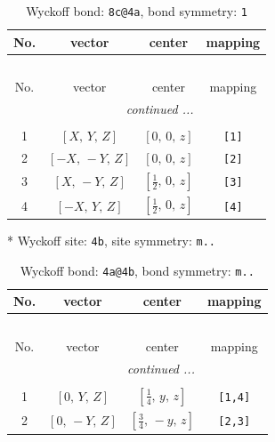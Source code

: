 \documentclass[fleqn,8pt]{jsarticle}
\begin{document}
\renewcommand{\arraystretch}{1.2}
\begin{longtable}{cccc}
\caption{Wyckoff bond: {\tt 8c@4a}, bond symmetry: {\tt 1}}
 \\
 \hline \hline
No. & vector & center & mapping \\ \hline \endfirsthead

\multicolumn{3}{l}{\tablename\ \thetable{}} \\
 \hline \hline
No. & vector & center & mapping \\ \hline \endhead

 \hline \hline
\multicolumn{3}{r}{\footnotesize\it continued ...} \\ \endfoot

 \hline \hline
\multicolumn{3}{r}{} \\ \endlastfoot

1 & $\left[ X,\, Y,\, Z \right]$ & $\left[ 0,\, 0,\, z \right]$ & {\tt [1]} \\ \hline
2 & $\left[ - X,\, - Y,\, Z \right]$ & $\left[ 0,\, 0,\, z \right]$ & {\tt [2]} \\ \hline
3 & $\left[ X,\, - Y,\, Z \right]$ & $\left[ \frac{1}{2},\, 0,\, z \right]$ & {\tt [3]} \\ \hline
4 & $\left[ - X,\, Y,\, Z \right]$ & $\left[ \frac{1}{2},\, 0,\, z \right]$ & {\tt [4]} \\
\end{longtable}
* Wyckoff site: {\tt 4b}, site symmetry: {\tt m..}
\renewcommand{\arraystretch}{1.2}
\begin{longtable}{cccc}
\caption{Wyckoff bond: {\tt 4a@4b}, bond symmetry: {\tt m..}}
 \\
 \hline \hline
No. & vector & center & mapping \\ \hline \endfirsthead

\multicolumn{3}{l}{\tablename\ \thetable{}} \\
 \hline \hline
No. & vector & center & mapping \\ \hline \endhead

 \hline \hline
\multicolumn{3}{r}{\footnotesize\it continued ...} \\ \endfoot

 \hline \hline
\multicolumn{3}{r}{} \\ \endlastfoot

1 & $\left[ 0,\, Y,\, Z \right]$ & $\left[ \frac{1}{4},\, y,\, z \right]$ & {\tt [1,4]} \\ \hline
2 & $\left[ 0,\, - Y,\, Z \right]$ & $\left[ \frac{3}{4},\, - y,\, z \right]$ & {\tt [2,3]} \\
\end{longtable}
\end{document}
